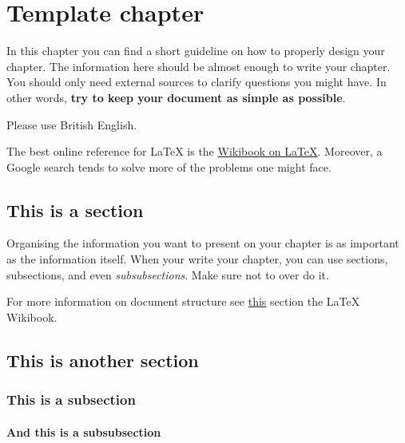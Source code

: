 \documentclass[11pt,a4paper,oneside]{book}
\newcommand{\latex}{\LaTeX\xspace} %
\begin{document}
\chapter{Template chapter}
\label{ch:template_chapter}
In this chapter you can find a short guideline on how to properly design your chapter. The information here should be almost enough to write your chapter. You should only need external sources to clarify questions you might have. In other words, \textbf{try to keep your document as simple as possible}.

Please use British English.

The best online reference for \latex is the \href{https://en.wikibooks.org/wiki/LaTeX}{Wikibook on \latex}. Moreover, a Google search tends to solve more of the problems one might face.

\section{This is a section}
\label{sec:document_structure}
Organising the information you want to present on your chapter is as important as the information itself. When your write your chapter, you can use sections, subsections, and even \textit{subsubsections}. Make sure not to over do it.

For more information on document structure see \href{https://en.wikibooks.org/wiki/LaTeX/Document_Structure}{this} section the \latex Wikibook.
\section{This is another section}
\subsection{This is a subsection}
\subsubsection{And this is a subsubsection}

\end{document}
